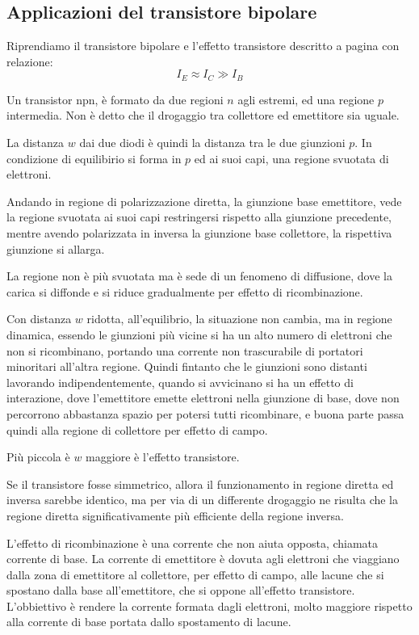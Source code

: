 \documentclass[../template]{subfiles}
\begin{document}
\subsection{Applicazioni del transistore bipolare}
Riprendiamo il transistore bipolare e l'effetto transistore descritto a pagina \pageref{section:transistor_bjt} con relazione:
\[
    I_E \approx I_C \gg I_B
\]

Un transistor npn, è formato da due regioni $n$ agli estremi, ed una regione $p$ intermedia.
Non è detto che il drogaggio tra collettore ed emettitore sia uguale.

La distanza $w$ dai due diodi è quindi la distanza tra le due giunzioni $p$. In condizione di equilibirio si forma in $p$ ed ai suoi capi, una regione svuotata di elettroni.

Andando in regione di polarizzazione diretta, la giunzione base emettitore, vede la regione svuotata ai suoi capi restringersi rispetto alla giunzione precedente, mentre avendo polarizzata in inversa la giunzione base collettore, la rispettiva giunzione si allarga.

La regione non è più svuotata ma è sede di un fenomeno di diffusione, dove la carica si diffonde e si riduce gradualmente per effetto di ricombinazione.

Con distanza $w$ ridotta, all'equilibrio, la situazione non cambia, ma in regione dinamica, essendo le giunzioni più vicine si ha un alto numero di elettroni che non si ricombinano, portando una corrente non trascurabile di portatori minoritari all'altra regione.
Quindi fintanto che le giunzioni sono distanti lavorando indipendentemente, quando si avvicinano si ha un effetto di interazione, dove l'emettitore emette elettroni nella giunzione di base, dove non percorrono abbastanza spazio per potersi tutti ricombinare, e buona parte passa quindi alla regione di collettore per effetto di campo.

Più piccola è $w$ maggiore è l'effetto transistore.

Se il transistore fosse simmetrico, allora il funzionamento in regione diretta ed inversa sarebbe identico, ma per via di un differente drogaggio ne risulta che la regione diretta significativamente più efficiente della regione inversa.

L'effetto di ricombinazione è una corrente che non aiuta opposta, chiamata corrente di base. La corrente di emettitore è dovuta agli elettroni che viaggiano dalla zona di emettitore al collettore, per effetto di campo, alle lacune che si spostano dalla base all'emettitore, che si oppone all'effetto transistore.
L'obbiettivo è rendere la corrente formata dagli elettroni, molto maggiore rispetto alla corrente di base portata dallo spostamento di lacune.
\end{document}
